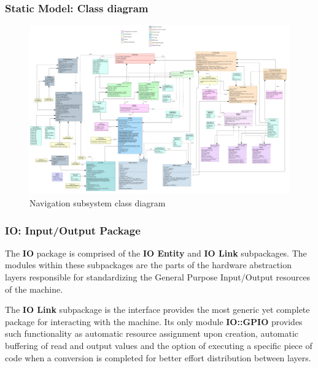 \subsubsection{Static Model: Class diagram}


\begin{figure}[H]
	\centering
	\includegraphics[width=\textwidth]{./img/navig-class-diagram.png}
	\caption {Navigation subsystem class diagram}
	\label{fig:navig-class-diagram}
	\end{figure}



\subsubsection{IO: Input/Output Package}
\label{sec:io-package}
The \textbf{IO} package is comprised of the \textbf{IO Entity} and \textbf{IO Link} subpackages. The modules within these subpackages are the parts of the hardware abstraction layers responsible for standardizing the General Purpose Input/Output resources of the machine.

The \textbf{IO Link} subpackage is the interface provides the most generic yet complete package for interacting with the machine. Its only module \textbf{IO::GPIO} provides such functionality as automatic resource assignment upon creation, automatic buffering of read and output values and the option of executing a specific piece of code when a conversion is completed for better effort distribution between layers.

